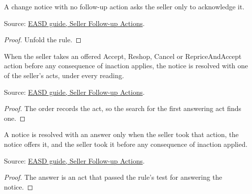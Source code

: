\begin{theorem}
  \label{thm:airline-change-acknowledge-only}
  A change notice with no follow-up action asks the seller only to
  acknowledge it.

  Source: \href{https://standards.atlassian.net/wiki/spaces/EASD/pages/574849094}{EASD guide, Seller Follow-up Actions}.
\end{theorem}
\begin{proof}
  Unfold the rule.
\end{proof}

\begin{theorem}
  \label{thm:airline-change-offered-action-answers}
  When the seller takes an offered Accept, Reshop, Cancel or
  RepriceAndAccept action before any consequence of inaction applies, the
  notice is resolved with one of the seller's acts, under every reading.

  Source: \href{https://standards.atlassian.net/wiki/spaces/EASD/pages/574849094}{EASD guide, Seller Follow-up Actions}.
\end{theorem}
\begin{proof}
  The order records the act, so the search for the first answering act finds
  one.
\end{proof}

\begin{theorem}
  \label{thm:airline-change-answers-sound}
  A notice is resolved with an answer only when the seller took that action,
  the notice offers it, and the seller took it before any consequence of
  inaction applied.

  Source: \href{https://standards.atlassian.net/wiki/spaces/EASD/pages/574849094}{EASD guide, Seller Follow-up Actions}.
\end{theorem}
\begin{proof}
  The answer is an act that passed the rule's test for answering the notice.
\end{proof}


